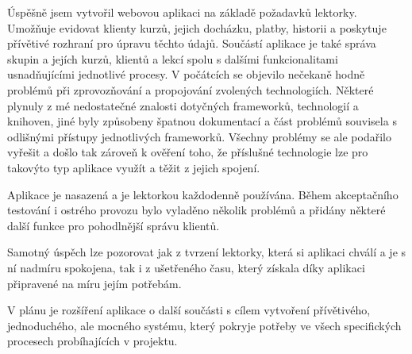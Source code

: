 Úspěšně jsem vytvořil webovou aplikaci na základě požadavků lektorky. Umožňuje evidovat klienty kurzů, jejich docházku, platby, historii a poskytuje přívětivé rozhraní pro úpravu těchto údajů. Součástí aplikace je také správa skupin a jejích kurzů, klientů a lekcí spolu s dalšími funkcionalitami usnadňujícími jednotlivé procesy.
V počátcích se objevilo nečekaně hodně problémů při zprovozňování a propojování zvolených technologiích. Některé plynuly z mé nedostatečné znalosti dotyčných frameworků, technologií a knihoven, jiné byly způsobeny špatnou dokumentací a část problémů souvisela s odlišnými přístupy jednotlivých frameworků. Všechny problémy se ale podařilo vyřešit a došlo tak zároveň k ověření toho, že příslušné technologie lze pro takovýto typ aplikace využít a těžit z jejich spojení.

Aplikace je nasazená a je lektorkou každodenně používána. Během akceptačního testování i ostrého provozu bylo vyladěno několik problémů a přidány některé další funkce pro pohodlnější správu klientů.

Samotný úspěch lze pozorovat jak z tvrzení lektorky, která si aplikaci chválí a je s ní nadmíru spokojena, tak i z ušetřeného času, který získala díky aplikaci připravené na míru jejím potřebám.

V plánu je rozšíření aplikace o další součásti s cílem vytvoření přívětivého, jednoduchého, ale mocného systému, který pokryje potřeby ve všech specifických procesech probíhajících v projektu.
